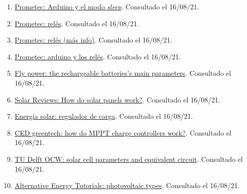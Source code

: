 \documentclass[12pt]{article}
\begin{document}
\begin{enumerate}
			\item 
			\label{bib: prometec modo sleep arduino}
			\href{https://www.prometec.net/el-modo-sleep-en-arduino/}{Prometec: Arduino y el modo \textit{sleep}}. Consultado el 16/08/21.
			
			\item 
			\label{bib: prometec relés}
			\href{https://www.prometec.net/reles-s4a/}{Prometec: relés}. Consultado el 16/08/21.
			
			\item 
			\label{bib: prometec relés (más info)}
			\href{https://www.prometec.net/mas-sobre-reles/}{Prometec: relés (más info)}. Consultado el 16/08/21.
			
			\item 
			\label{bib: prometec relés y arduino}
			\href{https://www.prometec.net/reles/}{Prometec: arduino y los relés}. Consultado el 16/08/21.
			
			\item 
			\label{bib: fly power rechargeable battery param}
			\href{https://fly-power.com/en/battery-knowledge/item/2-rechargeable-batteries-s-main-parameters}{Fly power: the rechargeable batteries's main parameters}. Consultado el 16/08/21.
			
			\item 
			\label{bib: solar reviews how solar panels work}
			\href{https://www.solarreviews.com/blog/how-do-solar-panels-work}{Solar Reviews: How do solar panels work?}. Consultado el 16/08/21.
			
			\item 
			\label{bib: energia solar regulador de carga}
			\href{https://solar-energia.net/energia-solar-fotovoltaica/elementos/instalaciones-autonomas/reguladores-carga}{Energía solar: regulador de carga}. Consultado el 16/08/21.
			
			\item 
			\label{bib: CED greentech how mppt works}
			\href{https://www.cedgreentech.com/article/how-do-mppt-charge-controllers-work}{CED greentech: how do MPPT charge controllers work?}. Consultado el 16/08/21.
			
			\item 
			\label{bib: TU delft OCW solar cell param}
			\href{https://ocw.tudelft.nl/wp-content/uploads/solar_energy_section_9_1_9_3.pdf}{TU Delft OCW: solar cell parameters and equivalent circuit}. Consultado el 16/08/21.
			
			\item 
			\label{bib: alternative energy photovoltaic types}
			\href{https://www.alternative-energy-tutorials.com/photovoltaics/photovoltaic-types.html}{Alternative Energy Tutorials: photovoltaic types}. Consultado el 16/08/21.
			

\end{enumerate}
\end{document}
